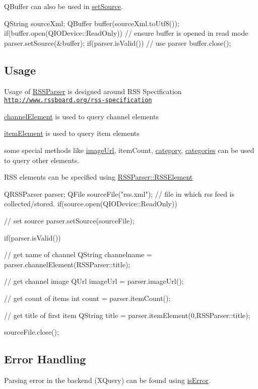 Q\-Buffer can also be used in \hyperlink{class_r_s_s_parser_a61ed20107ba616368c053eb61a99ba9d}{set\-Source}. 
\begin{DoxyCode}
    QString sourceXml;
    QBuffer buffer(sourceXml.toUtf8());
    if(buffer.open(QIODevice::ReadOnly)) // ensure buffer is opened in read
       mode
    {
        parser.setSource(&buffer);
        if(parser.isValid())
        {
        // use parser
        }
    }
    buffer.close();
\end{DoxyCode}
\hypertarget{class_r_s_s_parser_usage}{}\subsection{Usage}\label{class_r_s_s_parser_usage}
Usage of \hyperlink{class_r_s_s_parser}{R\-S\-S\-Parser} is designed around R\-S\-S Specification \href{http://www.rssboard.org/rss-specification}{\tt http\-://www.\-rssboard.\-org/rss-\/specification} \begin{DoxyItemize}
\item \hyperlink{class_r_s_s_parser_a6c15515c743ecaf311851dbfb4fa1f0c}{channel\-Element} is used to query channel elements \item \hyperlink{class_r_s_s_parser_adfad03c83d5a7a433c999a15b0ef1244}{item\-Element} is used to query item elements \item some special methods like \hyperlink{class_r_s_s_parser_a19db1bd2bf2b86f39c83b1516f390c3f}{image\-Url}, item\-Count, \hyperlink{class_r_s_s_parser_a207fae9001e240065c2d600d3638ce89}{category}, \hyperlink{class_r_s_s_parser_ab9398ef4aea9f70266590998c232f9a8}{categories} can be used to query other elements. \par
 R\-S\-S elements can be specified using \hyperlink{class_r_s_s_parser_a7abe04d86afbba935a94443444685310}{R\-S\-S\-Parser\-::\-R\-S\-S\-Element} 
\begin{DoxyCode}
    QRSSParser parser;
    QFile sourceFile("rss.xml"); // file in which rss feed is collected/stored.
    if(source.open(QIODevice::ReadOnly))
    {
       // set source
       parser.setSource(sourceFile);

       if(parser.isValid())
       {
       // get name of channel
       QString channelname = parser.channelElement(RSSParser::title);

       // get channel image
       QUrl imageUrl = parser.imageUrl();

       // get count of items
       int count = parser.itemCount();

       // get title of first item
       QString title = parser.itemElement(0,RSSParser::title);
       }
    }
    sourceFile.close();
\end{DoxyCode}
\end{DoxyItemize}
\hypertarget{class_r_s_s_parser_error}{}\subsection{Error Handling}\label{class_r_s_s_parser_error}
Parsing error in the backend (X\-Query) can be found using \hyperlink{class_r_s_s_parser_a2565557c7f7d5b348a4c2137d6916fcb}{is\-Error}.


